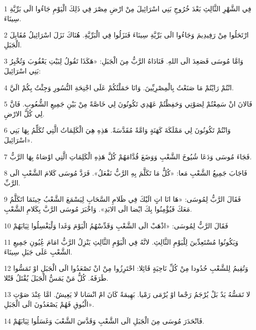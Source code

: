 \par 1 فِي الشَّهْرِ الثَّالِثِ بَعْدَ خُرُوجِ بَنِي اسْرَائِيلَ مِنْ ارْضِ مِصْرَ فِي ذَلِكَ الْيَوْمِ جَاءُوا الَى بَرِّيَّةِ سِينَاءَ.
\par 2 ارْتَحَلُوا مِنْ رَفِيدِيمَ وَجَاءُوا الَى بَرِّيَّةِ سِينَاءَ فَنَزَلُوا فِي الْبَرِّيَّةِ. هُنَاكَ نَزَلَ اسْرَائِيلُ مُقَابِلَ الْجَبَلِ.
\par 3 وَامَّا مُوسَى فَصَعِدَ الَى اللهِ. فَنَادَاهُ الرَّبُّ مِنَ الْجَبَلِ: «هَكَذَا تَقُولُ لِبَيْتِ يَعْقُوبَ وَتُخْبِرُ بَنِي اسْرَائِيلَ:
\par 4 انْتُمْ رَايْتُمْ مَا صَنَعْتُ بِالْمِصْرِيِّينَ. وَانَا حَمَلْتُكُمْ عَلَى اجْنِحَةِ النُّسُورِ وَجِئْتُ بِكُمْ الَيَّ.
\par 5 فَالانَ انْ سَمِعْتُمْ لِصَوْتِي وَحَفِظْتُمْ عَهْدِي تَكُونُونَ لِي خَاصَّةً مِنْ بَيْنِ جَمِيعِ الشُّعُوبِ. فَانَّ لِي كُلَّ الارْضِ.
\par 6 وَانْتُمْ تَكُونُونَ لِي مَمْلَكَةَ كَهَنَةٍ وَامَّةً مُقَدَّسَةً. هَذِهِ هِيَ الْكَلِمَاتُ الَّتِي تُكَلِّمُ بِهَا بَنِي اسْرَائِيلَ».
\par 7 فَجَاءَ مُوسَى وَدَعَا شُيُوخَ الشَّعْبِ وَوَضَعَ قُدَّامَهُمْ كُلَّ هَذِهِ الْكَلِمَاتِ الَّتِي اوْصَاهُ بِهَا الرَّبُّ.
\par 8 فَاجَابَ جَمِيعُ الشَّعْبِ مَعا: «كُلُّ مَا تَكَلَّمَ بِهِ الرَّبُّ نَفْعَلُ». فَرَدَّ مُوسَى كَلامَ الشَّعْبِ الَى الرَّبِّ.
\par 9 فَقَالَ الرَّبُّ لِمُوسَى: «هَا انَا اتٍ الَيْكَ فِي ظَلامِ السَّحَابِ لِيَسْمَعَ الشَّعْبُ حِينَمَا اتَكَلَّمُ مَعَكَ فَيُؤْمِنُوا بِكَ ايْضا الَى الابَدِ». وَاخْبَرَ مُوسَى الرَّبَّ بِكَلامِ الشَّعْبِ.
\par 10 فَقَالَ الرَّبُّ لِمُوسَى: «اذْهَبْ الَى الشَّعْبِ وَقَدِّسْهُمُ الْيَوْمَ وَغَدا وَلْيَغْسِلُوا ثِيَابَهُمْ
\par 11 وَيَكُونُوا مُسْتَعِدِّينَ لِلْيَوْمِ الثَّالِثِ. لانَّهُ فِي الْيَوْمِ الثَّالِثِ يَنْزِلُ الرَّبُّ امَامَ عُِيُونِ جَمِيعِ الشَّعْبِ عَلَى جَبَلِ سِينَاءَ.
\par 12 وَتُقِيمُ لِلشَّعْبِ حُدُودا مِنْ كُلِّ نَاحِيَةٍ قَائِلا: احْتَرِزُوا مِنْ انْ تَصْعَدُوا الَى الْجَبَلِ اوْ تَمَسُّوا طَرَفَهُ. كُلُّ مَنْ يَمَسُّ الْجَبَلَ يُقْتَلُ قَتْلا.
\par 13 لا تَمَسُّهُ يَدٌ بَلْ يُرْجَمُ رَجْما اوْ يُرْمَى رَمْيا. بَهِيمَةً كَانَ امْ انْسَانا لا يَعِيشُ. امَّا عِنْدَ صَوْتِ الْبُوقِ فَهُمْ يَصْعَدُونَ الَى الْجَبَلِ».
\par 14 فَانْحَدَرَ مُوسَى مِنَ الْجَبَلِ الَى الشَّعْبِ وَقَدَّسَ الشَّعْبَ وَغَسَلُوا ثِيَابَهُمْ.
